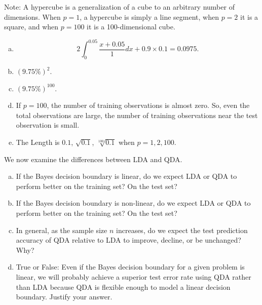 \documentclass[14pt]{elegantbook}
\begin{document}
\begin{exercise*}[4.4]
\begin{enumerate}[(a)]
    Note: A hypercube is a generalization of a cube to an arbitrary number of dimensions. When $p = 1$, a hypercube is simply a line segment, when $p = 2$ it is a square, and when $p = 100$ it is a 100-dimensional cube. 
  \end{enumerate}
\end{exercise*}

\begin{solution}
  \begin{enumerate}[(a)]
    \item \[2\int_0^{0.05}\frac{x+0.05}{1}dx+0.9\times 0.1=0.0975.\]
    \item $(9.75\%)^2$. 
    \item $(9.75\%)^{100}$. 
    \item If $p=100$, the number of training observations is almost zero. So, even the total observations are large, the number of training observations near the test observation is small. 
    \item The Length is $0.1$, $\sqrt{0.1}$, $\sqrt[100]{0.1}$ when $p=1,2,100$. 
  \end{enumerate}
\end{solution}

\begin{exercise*}[4.5]
  We now examine the differences between LDA and QDA. 
  \begin{enumerate}[(a)]
    \item If the Bayes decision boundary is linear, do we expect LDA or QDA to perform better on the training set? On the test set? 
    \item If the Bayes decision boundary is non-linear, do we expect LDA or QDA to perform better on the training set? On the test set?
    \item In general, as the sample size $n$ increases, do we expect the test prediction accuracy of QDA relative to LDA to improve, decline, or be unchanged? Why?
    \item True or False: Even if the Bayes decision boundary for a given problem is linear, we will probably achieve a superior test error rate using QDA rather than LDA because QDA is flexible enough to model a linear decision boundary. Justify your answer. 
  \end{enumerate}
\end{exercise*}
\end{document}
